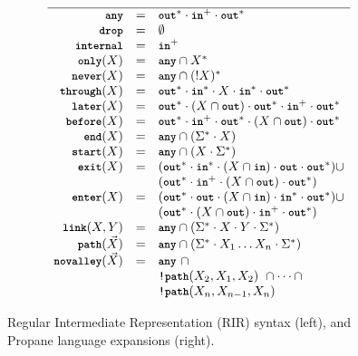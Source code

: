 \documentclass[10pt]{sigalternate052015}
\newcommand{\KW}[1]{\texttt{\small\bfseries{#1}}}
\newcommand{\Any}{\KW{any}}
\newcommand{\None}{\KW{drop}}
\newcommand{\In}{\KW{in}}
\newcommand{\Out}{\KW{out}}
\newcommand{\NOT}{\texttt{!}}
\newcommand{\Exit}{\KW{exit}}
\newcommand{\End}{\KW{end}}
\newcommand{\Start}{\KW{start}}
\newcommand{\Enter}{\KW{enter}}
\newcommand{\Later}{\KW{later}}
\newcommand{\Before}{\KW{before}}
\newcommand{\Internal}{\KW{internal}}
\newcommand{\Never}{\KW{never}}
\newcommand{\Only}{\KW{only}}
\newcommand{\Through}{\KW{through}}
\newcommand{\LinkKW}{\KW{link}}
\newcommand{\PathKW}{\KW{path}}
\newcommand{\Novalley}{\KW{novalley}}
\begin{document}
\begin{figure}[t]
\begin{minipage}[t]{.45\linewidth}
  \end{minipage}
  ~~
  \vrule
  ~~
  \begin{minipage}[t]{.5\linewidth}\small
  \vspace*{-1\baselineskip}
  \[\begin{array}{rcl}
    \hline
    \Any           & = & \Out^* \cdot \In^+ \cdot \Out^* \\
    \None          & = & \emptyset \\
    \Internal      & = & \In^+ \\
    \Only(X)       & = & \Any \cap X^* \\
    \Never(X)      & = & \Any \cap (!X)^* \\
    \Through(X)    & = & \Out^* \cdot \In^* \cdot X \cdot \In^* \cdot \Out^* \\
    \Later(X)      & = & \Out^* \cdot (X \cap \Out) \cdot \Out^* \cdot \In^+ \cdot \Out^* \\
    \Before(X)     & = & \Out^* \cdot \In^+ \cdot \Out^* \cdot (X \cap \Out) \cdot \Out^* \\
    \End(X)        & = & \Any \cap (\Sigma^* \cdot X) \\
    \Start(X)      & = & \Any \cap (X \cdot \Sigma^*) \\
    \Exit(X)       & = & (\Out^* \cdot \In^* \cdot (X \cap \In) \cdot \Out \cdot \Out^*) \cup \\
                  &        & (\Out^* \cdot \In^+ \cdot (X \cap \Out) \cdot \Out^*) \\
    \Enter(X)      & = & (\Out^* \cdot \Out \cdot (X \cap \In) \cdot \In^* \cdot \Out^*) \cup \\
                  &        & (\Out^* \cdot (X \cap \Out) \cdot \In^+ \cdot \Out^*) \\
    \LinkKW(X,Y)     & = & \Any \cap (\Sigma^* \cdot X \cdot Y \cdot \Sigma^*) \\
    \PathKW(\vec{X}) & = & \Any \cap (\Sigma^* \cdot X_1 \dots X_n \cdot \Sigma^*) \\
    \Novalley(\vec{X}) & = & \Any ~ \cap \\
                  &   & \NOT\PathKW(X_2,X_1,X_2) ~ \cap \dots \cap \\
                  &   & \NOT\PathKW(X_n,X_{n-1},X_n) \\
  \end{array} \]

  \end{minipage}

  \hrulefill

  \caption{Regular Intermediate Representation (RIR) syntax (left), and
           Propane language expansions (right).}
  \label{fig:rir-syntax}
\end{figure}
\end{document}
